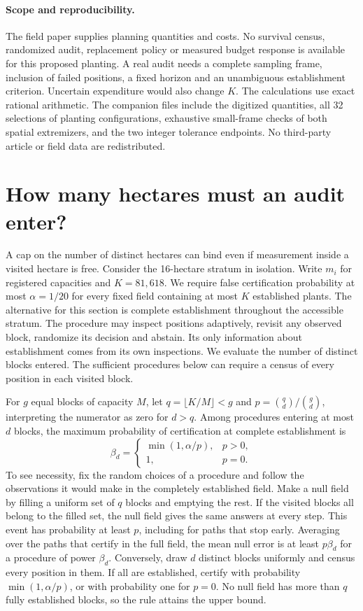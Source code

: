 \documentclass[10pt]{article}
\begin{document}
\paragraph{Scope and reproducibility.} The field paper supplies planning quantities and costs. No survival census, randomized audit, replacement policy or measured budget response is available for this proposed planting. A real audit needs a complete sampling frame, inclusion of failed positions, a fixed horizon and an unambiguous establishment criterion. Uncertain expenditure would also change $K$. The calculations use exact rational arithmetic. The companion files include the digitized quantities, all 32 selections of planting configurations, exhaustive small-frame checks of both spatial extremizers, and the two integer tolerance endpoints. No third-party article or field data are redistributed.
\section{How many hectares must an audit enter?}
A cap on the number of distinct hectares can bind even if measurement inside a visited hectare is free. Consider the 16-hectare stratum in isolation. Write $m_i$ for registered capacities and $K=81{,}618$. We require false certification probability at most $\alpha=1/20$ for every fixed field containing at most $K$ established plants. The alternative for this section is complete establishment throughout the accessible stratum. The procedure may inspect positions adaptively, revisit any observed block, randomize its decision and abstain. Its only information about establishment comes from its own inspections. We evaluate the number of distinct blocks entered. The sufficient procedures below can require a census of every position in each visited block.

For $g$ equal blocks of capacity $M$, let $q=\lfloor K/M\rfloor<g$ and $p={q\choose d}/{g\choose d}$, interpreting the numerator as zero for $d>q$. Among procedures entering at most $d$ blocks, the maximum probability of certification at complete establishment is
\[
  \beta_d=\begin{cases}\min(1,\alpha/p),&p>0,\\1,&p=0.\end{cases}
\]
To see necessity, fix the random choices of a procedure and follow the observations it would make in the completely established field. Make a null field by filling a uniform set of $q$ blocks and emptying the rest. If the visited blocks all belong to the filled set, the null field gives the same answers at every step. This event has probability at least $p$, including for paths that stop early. Averaging over the paths that certify in the full field, the mean null error is at least $p\beta_d$ for a procedure of power $\beta_d$. Conversely, draw $d$ distinct blocks uniformly and census every position in them. If all are established, certify with probability $\min(1,\alpha/p)$, or with probability one for $p=0$. No null field has more than $q$ fully established blocks, so the rule attains the upper bound.
\end{document}
